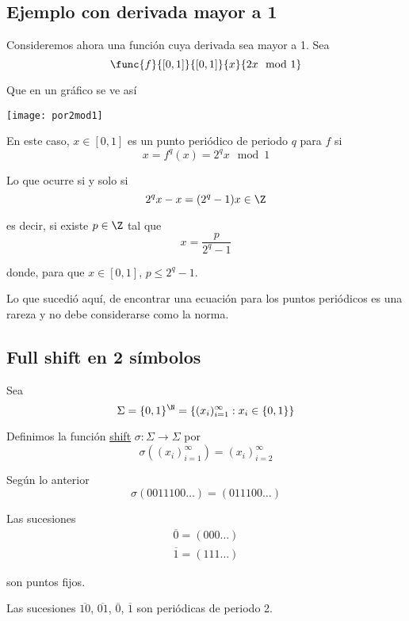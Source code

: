 \documentclass[	docname= Sistemas\ Din\'amicos,
				finished=1,
				semester=1,
				year=2017,
				professor=Godofredo\ Iommi,
				sigla=MAT2565]{apunte}
\begin{document}
\subsection{Ejemplo con derivada mayor a 1}
Consideremos ahora una función cuya derivada sea mayor a 1. Sea 
	$$\func{f}{[0,1]}{[0,1]}
		{x}{2x \mod 1}$$
	
Que en un gráfico se ve así
	\begin{center}
		\texttt{[image: por2mod1]}
	\end{center}

En este caso, $x \in [0,1]$ es un punto periódico de periodo $q$ para $f$ si
	$$x = f^{q}(x) = 2^{q}x \mod 1$$

Lo que ocurre si y solo si
	$$2^{q}x - x = (2^{q} - 1)x \in \Z$$

es decir, si existe $p \in \Z$ tal que
	$$x = \frac{p}{2^{q}-1}$$

donde, para que $x \in [0,1]$, $p \leq 2^{q}-1$.

\begin{obs*} Lo que sucedió aquí, de encontrar una ecuación para los puntos periódicos es una rareza y no debe considerarse como la norma.
\end{obs*}

\subsection{Full shift en 2 símbolos}
Sea
	$$\Sigma = \{0,1\}^{\N} = \{(x_{i})_{i=1}^{\infty} : x_{i} \in \{0,1\} \} $$

Definimos la función \underline{shift} $\sigma: \Sigma \to \Sigma$ por
	$$\sigma((x_{i})_{i=1}^{\infty}) = (x_{i})_{i=2}^{\infty}$$

\begin{ex} Según lo anterior
	$$\sigma(0011100\ldots) = (011100\ldots)$$
\end{ex}

\begin{ex} Las sucesiones
	\begin{align*}
		\overline{0} = (000\ldots)	\\
		\overline{1} = (111\ldots)
	\end{align*}

son puntos fijos.
\end{ex}

\begin{ex} Las sucesiones $\overline{10}$, $\overline{01}$, $\overline{0}$, $\overline{1}$ son periódicas de periodo 2.
\end{ex}
\end{document}
